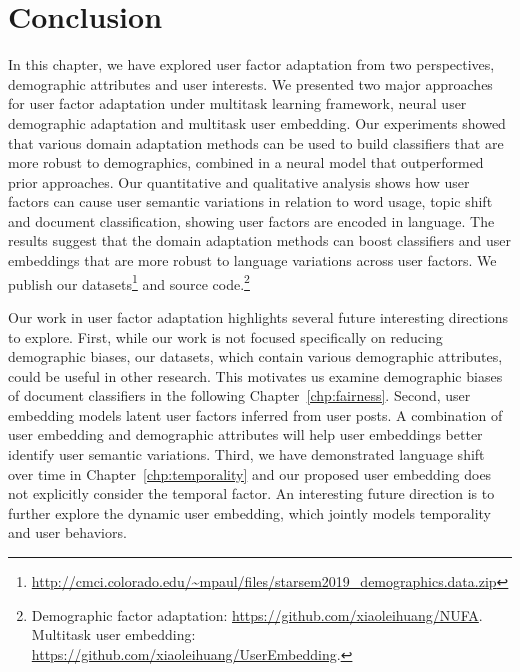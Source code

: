 \section{Conclusion}

In this chapter, we have explored user factor adaptation from two perspectives, demographic attributes and user interests.
We presented two major approaches for user factor adaptation under multitask learning framework, neural user demographic adaptation and multitask user embedding.
Our experiments showed that various domain adaptation methods can be used to build classifiers that are more robust to demographics, combined in a neural model that outperformed prior approaches.
Our quantitative and qualitative analysis shows how user factors can cause user semantic variations in relation to word usage, topic shift and document classification, showing user factors are encoded in language.
The results suggest that the domain adaptation methods can boost classifiers and user embeddings that are more robust to language variations across user factors.
We publish our datasets\footnote{\url{http://cmci.colorado.edu/~mpaul/files/starsem2019_demographics.data.zip}} and source code.\footnote{Demographic factor adaptation: \url{https://github.com/xiaoleihuang/NUFA}. Multitask user embedding: \url{https://github.com/xiaoleihuang/UserEmbedding}.}

Our work in user factor adaptation highlights several future interesting directions to explore.
First, while our work is not focused specifically on reducing demographic biases,
our datasets, which contain various demographic attributes, could be useful in other research. 
This motivates us examine demographic biases of document classifiers in the following Chapter~\ref{chp:fairness}. 
Second, user embedding models latent user factors inferred from user posts. A combination of user embedding and demographic attributes will help user embeddings better identify user semantic variations. 
Third, we have demonstrated language shift over time in Chapter~\ref{chp:temporality} and our proposed user embedding does not explicitly consider the temporal factor. An interesting future direction is to further explore the dynamic user embedding, which jointly models temporality and user behaviors.
